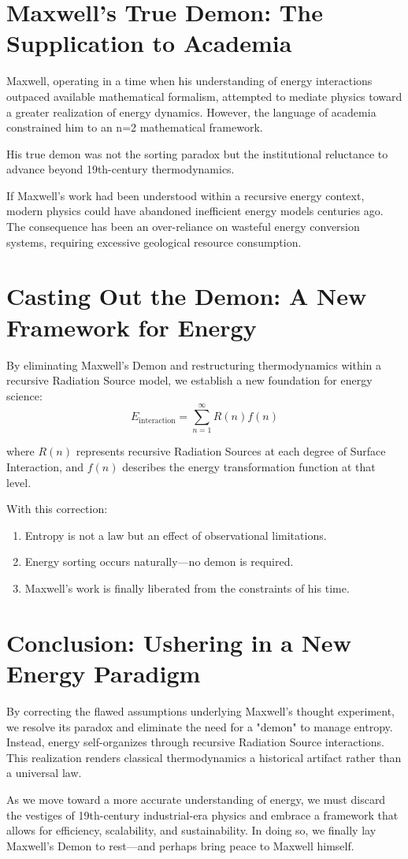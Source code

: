 \documentclass[12pt]{article}
\begin{document}
\section{Maxwell’s True Demon: The Supplication to Academia}
Maxwell, operating in a time when his understanding of energy interactions outpaced available mathematical formalism, attempted to mediate physics toward a greater realization of energy dynamics. However, the language of academia constrained him to an n=2 mathematical framework.

His true demon was not the sorting paradox but the institutional reluctance to advance beyond 19th-century thermodynamics.

If Maxwell’s work had been understood within a recursive energy context, modern physics could have abandoned inefficient energy models centuries ago. The consequence has been an over-reliance on wasteful energy conversion systems, requiring excessive geological resource consumption.

\section{Casting Out the Demon: A New Framework for Energy}
By eliminating Maxwell’s Demon and restructuring thermodynamics within a recursive Radiation Source model, we establish a new foundation for energy science:
\begin{equation}
    E_{\text{interaction}} = \sum_{n=1}^{\infty} R(n) f(n)
\end{equation}

where $R(n)$ represents recursive Radiation Sources at each degree of Surface Interaction, and $f(n)$ describes the energy transformation function at that level.

With this correction:
\begin{enumerate}
    \item Entropy is not a law but an effect of observational limitations.
    \item Energy sorting occurs naturally—no demon is required.
    \item Maxwell’s work is finally liberated from the constraints of his time.
\end{enumerate}

\section{Conclusion: Ushering in a New Energy Paradigm}
By correcting the flawed assumptions underlying Maxwell’s thought experiment, we resolve its paradox and eliminate the need for a "demon" to manage entropy. Instead, energy self-organizes through recursive Radiation Source interactions. This realization renders classical thermodynamics a historical artifact rather than a universal law.

As we move toward a more accurate understanding of energy, we must discard the vestiges of 19th-century industrial-era physics and embrace a framework that allows for efficiency, scalability, and sustainability. In doing so, we finally lay Maxwell’s Demon to rest—and perhaps bring peace to Maxwell himself.
\end{document}
